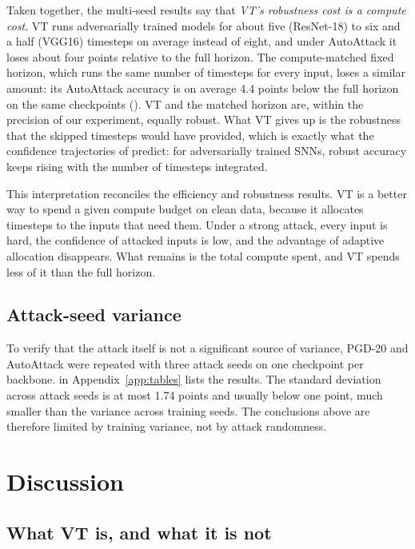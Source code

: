 Taken together, the multi-seed results say that \emph{VT's robustness cost is a compute cost}. VT runs adversarially trained models for about five (ResNet-18) to six and a half (VGG16) timesteps on average instead of eight, and under AutoAttack it loses about four points relative to the full horizon. The compute-matched fixed horizon, which runs the same number of timesteps for every input, loses a similar amount: its AutoAttack accuracy is on average 4.4 points below the full horizon on the same checkpoints (). VT and the matched horizon are, within the precision of our experiment, equally robust. What VT gives up is the robustness that the skipped timesteps would have provided, which is exactly what the confidence trajectories of  predict: for adversarially trained SNNs, robust accuracy keeps rising with the number of timesteps integrated.

This interpretation reconciles the efficiency and robustness results. VT is a better way to spend a given compute budget on clean data, because it allocates timesteps to the inputs that need them. Under a strong attack, every input is hard, the confidence of attacked inputs is low, and the advantage of adaptive allocation disappears. What remains is the total compute spent, and VT spends less of it than the full horizon.

\subsection{Attack-seed variance}

To verify that the attack itself is not a significant source of variance, PGD-20 and AutoAttack were repeated with three attack seeds on one checkpoint per backbone.  in Appendix~\ref{app:tables} lists the results. The standard deviation across attack seeds is at most 1.74 points and usually below one point, much smaller than the variance across training seeds. The conclusions above are therefore limited by training variance, not by attack randomness.

\section{Discussion}
\label{sec:res-discussion}

\subsection{What VT is, and what it is not}

